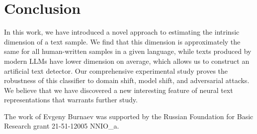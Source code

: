 \documentclass{article}
\begin{document}
\section{Conclusion}\label{sec:concl}

In this work, we have introduced a novel approach to estimating the intrinsic dimension of a text sample. We find that this dimension is approximately the same for all human-written samples in a given language, while texts produced by modern LLMs have lower dimension on average, which allows us to construct an artificial text detector. Our comprehensive experimental study proves the robustness of this classifier to domain shift, model shift, and adversarial attacks. We believe that we have discovered a new interesting feature of neural text representations that warrants further study. 

\begin{ack}
The work of Evgeny Burnaev was supported by the Russian Foundation for Basic Research grant 21-51-12005 NNIO\_a.
\end{ack}




{
\small




}

\newpage
\appendix


\end{document}

